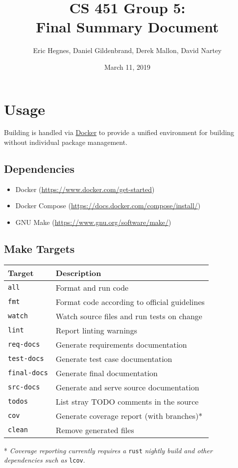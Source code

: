 \documentclass[titlepage]{article}
\title{CS 451 Group 5:\\Final Summary Document}
\author{Eric Hegnes, Daniel Gildenbrand, Derek Mallon, David Nartey}
\date{March 11, 2019}
\begin{document}
\maketitle
\tableofcontents

\section{Usage}
Building is handled via \href{https://www.docker.com/}{Docker} to provide a unified environment for building
without individual package management.

\subsection{Dependencies}
\begin{itemize}
  \item Docker (\url{https://www.docker.com/get-started})
  \item Docker Compose (\url{https://docs.docker.com/compose/install/})
  \item GNU Make (\url{https://www.gnu.org/software/make/})
\end{itemize}

\subsection{Make Targets}
\begin{tabularx}{\textwidth}{|l|X|}
  \hline
  Target & Description  \\ \hline
  \texttt{all} & Format and run code  \\
  \texttt{fmt} & Format code according to official guidelines  \\
  \texttt{watch} & Watch source files and run tests on change  \\
  \texttt{lint} & Report linting warnings  \\
  \texttt{req-docs} & Generate requirements documentation  \\
  \texttt{test-docs} & Generate test case documentation  \\
  \texttt{final-docs} & Generate final documentation  \\
  \texttt{src-docs} & Generate and serve source documentation  \\
  \texttt{todos} & List stray TODO comments in the source  \\
  \texttt{cov} & Generate coverage report (with branches)*  \\
  \texttt{clean} & Remove generated files \\
  \hline
\end{tabularx}
* \textit{Coverage reporting currently requires a} \texttt{rust} \textit{nightly build
and other dependencies such as} \texttt{lcov}.
\end{document}
